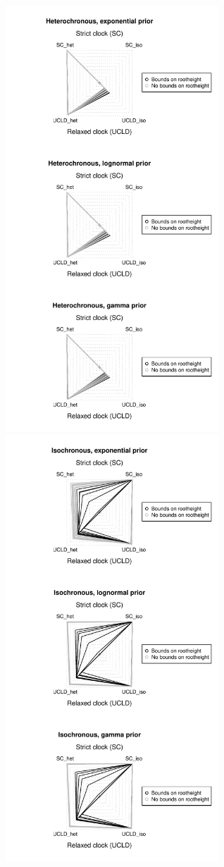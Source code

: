\documentclass[10pt,letterpaper]{article}
\begin{document}
\includegraphics[width=8cm]{sandbox_figures/het_sims.pdf}\newline
\includegraphics[width=8cm]{sandbox_figures/iso_sims.pdf}\newline
\end{document}
